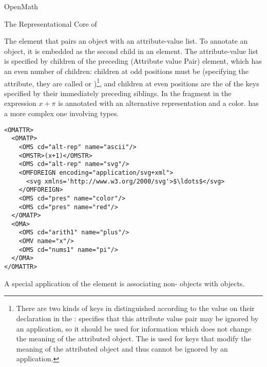 \begin{omgroup}[id=mobj,short=Mathematical Objects]
\begin{omgroup}[id=openmath]{OpenMath}
\begin{module}[id=OpenMath]
\begin{omgroup}[id=om.core]{The Representational Core of {\openmath}}
\begin{definition}[id=omattr.def]
  The {} element that pairs an {\openmath} object with an
  attribute-value list. To annotate an {\openmath} object, it is embedded as the second
  child in an  element. The attribute-value list is specified
  by children of the preceding {} (Attribute value Pair) element,
  which has an even number of children: children at odd positions must be
   (specifying the attribute, they are called  or
  )\footnote{There are two kinds of keys in {\openmath} distinguished
    according to the  value on their 
    declaration in the {}:
     specifies that this attribute value pair may be
    ignored by an application, so it should be used for information which does not change
    the meaning of the attributed {\openmath} object. The  is
    used for keys that modify the meaning of the attributed {\openmath} object and thus
    cannot be ignored by an application.}, and children at even positions are the
   of the keys specified by their immediately preceding siblings. In the
  {\openmath} fragment in {} the expression $x+\pi$ is annotated with an
  alternative representation and a color.  {} has a more complex
  one involving types.
\end{definition}

\begin{lstlisting}[language=OpenMath,label=lst:omattr,mathescape,
                   caption={Associating Alternate Representations with an
                   {\openmath} Object},
                   numbers=none,index={OMATTR,OMATP}]
<OMATTR>
  <OMATP>
    <OMS cd="alt-rep" name="ascii"/>
    <OMSTR>(x+1)</OMSTR>
    <OMS cd="alt-rep" name="svg"/>
    <OMFOREIGN encoding="application/svg+xml">
      <svg xmlns='http://www.w3.org/2000/svg'>$\ldots$</svg>
    </OMFOREIGN>
    <OMS cd="pres" name="color"/>
    <OMS cd="pres" name="red"/>
  </OMATP>
  <OMA>
    <OMS cd="arith1" name="plus"/>
    <OMV name="x"/>
    <OMS cd="nums1" name="pi"/>
  </OMA>
</OMATTR>
\end{lstlisting}

A special application of the  element is associating
non-{} objects with {\openmath} objects.


\end{omgroup}
\end{module}
\end{omgroup}
\end{omgroup}
